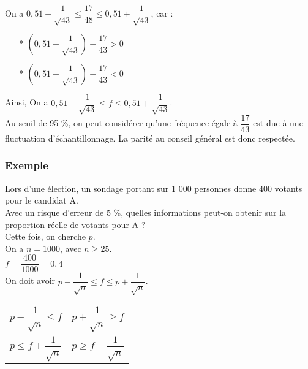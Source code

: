 On a $ 0,51 - \dfrac{1}{\sqrt{43}} \leq \dfrac{17}{48} \leq 0,51 + \dfrac{1}{\sqrt{43}} $, car : \\

\begin{itemize}
\item[*] $ \left(0,51 + \dfrac{1}{\sqrt{43}}\right) - \dfrac{17}{43} > 0  $
\item[*] $ \left(0,51 - \dfrac{1}{\sqrt{43}}\right) - \dfrac{17}{43} < 0 $
\end{itemize}

\vspace{.3cm}

Ainsi, On a $ 0,51 - \dfrac{1}{\sqrt{43}} \leq f \leq 0,51 + \dfrac{1}{\sqrt{43}} $. \\

Au seuil de 95  \%, on peut considérer qu'une fréquence égale à $\dfrac{17}{43}$ est due à une fluctuation d'échantillonnage. La parité au conseil général est donc respectée. 

\newpage 

\subsubsection{Exemple }

Lors d'une élection, un sondage portant sur 1 000 personnes donne 400 votants pour le candidat A. \\ Avec un risque d'erreur de 5  \%, quelles informations peut-on obtenir sur la proportion réelle de votants pour A ? \\

Cette fois, on cherche $p$. \\

On a $n = 1000 $, avec $ n \geq 25 $. \\

$ f = \dfrac{400}{1000} = 0,4 $ \\

On doit avoir $ p - \dfrac{1}{\sqrt{n}} \leq f \leq p + \dfrac{1}{\sqrt{n}} $.

\vspace*{.3cm}

\begin{tabular}{ll}
$ p - \dfrac{1}{\sqrt{n}} \leq f $ & $ p + \dfrac{1}{\sqrt{n}} \geq f $ \\
$ p \leq f + \dfrac{1}{\sqrt{n}}$ & $ p \geq f - \dfrac{1}{\sqrt{n}}$ \\
\end{tabular}

